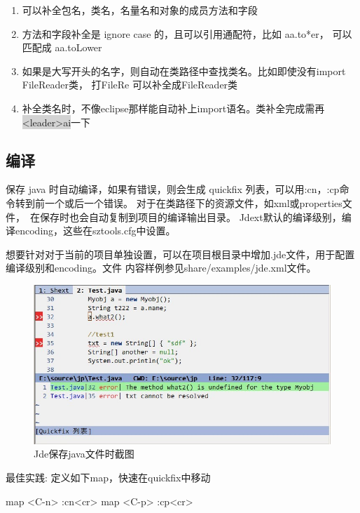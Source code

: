 \documentclass[oneside,openany]{book}
\begin{document}
    \begin{enumerate}
      \item 可以补全包名，类名，名量名和对象的成员方法和字段
      \item 方法和字段补全是 ignore case 的，且可以引用通配符，比如 aa.to*er， 可以匹配成 aa.toLower
      \item 如果是大写开头的名字，则自动在类路径中查找类名。比如即使没有import FileReader类， 打FileRe 可以补全成FileReader类 
      \item 补全类名时，不像eclipse那样能自动补上import语名。类补全完成需再\colorbox{lightgray}{<leader>ai}一下
    \end{enumerate}
    
\subsection{编译}
    保存 java 时自动编译，如果有错误，则会生成 quickfix 列表，可以用:cn，:cp命令转到前一个或后一个错误。
    对于在类路径下的资源文件，如xml或properties文件，　在保存时也会自动复制到项目的编译输出目录。
    Jdext默认的编译级别，编译encoding，这些在sztools.cfg中设置。

    想要针对对于当前的项目单独设置，可以在项目根目录中增加.jde文件，用于配置编译级别和encoding。文件
内容样例参见share/examples/jde.xml文件。


  \begin{figure}[htbp]%
  \centering
  \includegraphics[scale=0.5]{compile.jpg}
  \caption{Jde保存java文件时截图}
  \end{figure}

  \begin{mdframed}[style=BestPracticeFrame]
  \begin{flushleft}
    最佳实践: 定义如下map，快速在quickfix中移动

    map <C-n> :cn<cr>\newline
    map <C-p> :cp<cr>
  \end{flushleft}
  \end{mdframed}
\end{document}
